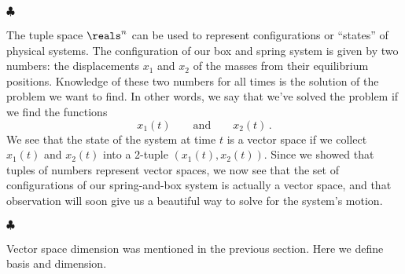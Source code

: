 \begin{flushleft} $\clubsuit$ \end{flushleft}
The tuple space $\reals^n$ can be used to represent configurations or ``states'' of physical systems.
The configuration of our box and spring system is given by two numbers: the displacements $x_1$ and $x_2$ of the masses from their equilibrium positions.
Knowledge of these two numbers for all times is the solution of the problem we want to find.
In other words, we say that we've solved the problem if we find the functions
\begin{equation*}
  x_1(t) \qquad \textrm{and} \qquad x_2(t) \, .
\end{equation*}
We see that the state of the system at time $t$ is a vector space if we collect $x_1(t)$ and $x_2(t)$ into a 2-tuple $(x_1(t), x_2(t))$.
Since we showed that tuples of numbers represent vector spaces, we now see that the set of configurations of our spring-and-box system is actually a vector space, and that observation will soon give us a beautiful way to solve for the system's motion.
\begin{flushright} $\clubsuit$ \end{flushright}


Vector space dimension was mentioned in the previous section.
Here we define basis and dimension.

